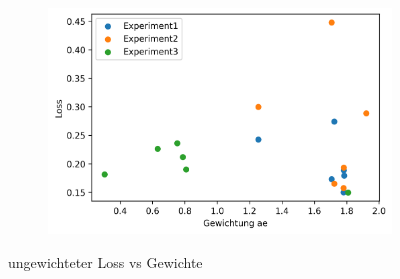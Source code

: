 \begin{figure}[h]
\begin{subfigure}[c]{0.31\textwidth}
		\includegraphics[width=1\textwidth, center]{bilder/Hauptteil/Step4_Data/Auto_Loss_Gewichtung_Ae.png}
		\end{subfigure}
	\label{img:AutoMlGewichtungAcc}
	\caption{ungewichteter Loss vs Gewichte}
	\end{figure} 	
